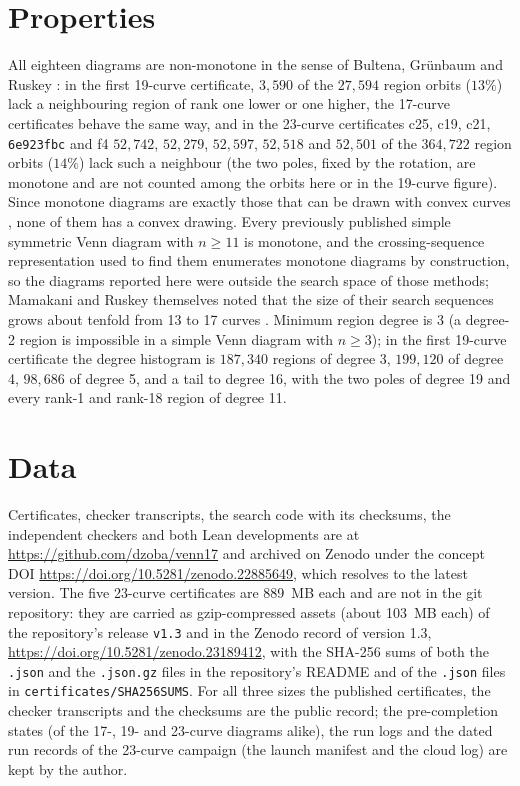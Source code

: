 \documentclass[11pt]{article}
\begin{document}
\section{Properties}\label{sec:properties}
All eighteen diagrams are non-monotone in the sense of Bultena, Gr\"unbaum and Ruskey \cite{BGR99}: in the first 19-curve certificate, $3{,}590$ of the $27{,}594$ region orbits
($13\%$) lack a neighbouring region of rank one lower or one higher, the 17-curve certificates behave the same
way, and in the 23-curve certificates c25, c19, c21, \texttt{6e923fbc} and f4 $52{,}742$, $52{,}279$, $52{,}597$,
$52{,}518$ and $52{,}501$ of the $364{,}722$ region orbits ($14\%$) lack such a neighbour (the two poles, fixed by the rotation, are
monotone and are not counted among the orbits here or in the 19-curve figure). Since monotone diagrams are exactly those
that can be drawn with convex curves \cite{BGR99}, none of them
has a convex drawing. Every previously published simple symmetric Venn diagram with $n\ge 11$ is
monotone, and the crossing-sequence representation used to find them \cite{MR14,MMR12} enumerates monotone diagrams by
construction, so the diagrams reported here were outside the search space of those methods; Mamakani and Ruskey
themselves noted that the size of their search sequences grows about tenfold from 13 to 17 curves \cite{MR14}. Minimum region degree is 3 (a degree-2 region is impossible in a simple
Venn diagram with $n\ge3$); in the first 19-curve certificate the degree histogram is $187{,}340$ regions of degree 3,
$199{,}120$ of degree 4, $98{,}686$ of degree 5, and a tail to degree 16, with the two poles of degree 19 and every
rank-1 and rank-18 region of degree 11.

\section{Data}
Certificates, checker transcripts, the search code with its checksums, the independent checkers and both
Lean developments are at \url{https://github.com/dzoba/venn17} and archived on Zenodo under the concept DOI
\url{https://doi.org/10.5281/zenodo.22885649}, which resolves to the latest version. The five 23-curve certificates are
889~MB each and are not in the git repository: they are carried as gzip-compressed assets (about 103~MB each) of the
repository's release \texttt{v1.3} and in the Zenodo record of version 1.3,
\url{https://doi.org/10.5281/zenodo.23189412}, with the SHA-256 sums of both the \texttt{.json} and the \texttt{.json.gz} files in the repository's README
and of the \texttt{.json} files in \texttt{certificates/SHA256SUMS}. For all three sizes the published certificates,
the checker transcripts and the checksums are the public record; the pre-completion states (of the 17-, 19- and
23-curve diagrams alike), the run logs and the dated run records of the 23-curve campaign (the launch manifest and
the cloud log) are kept by the author.
\end{document}
